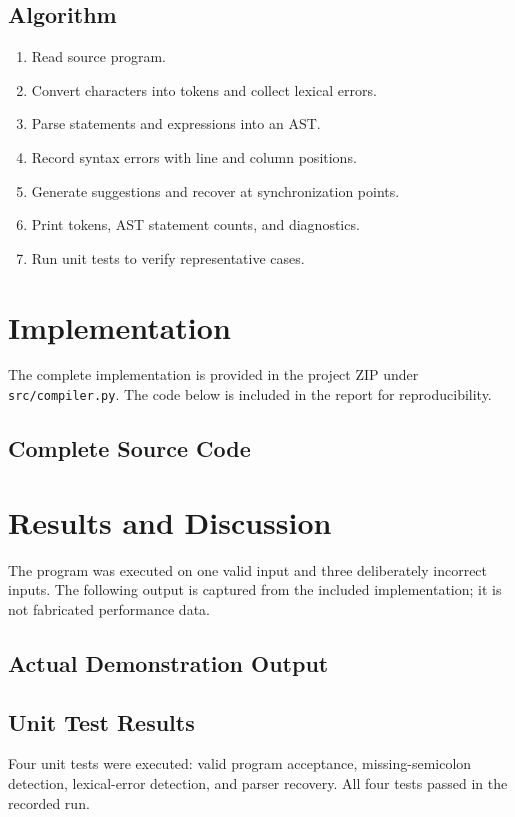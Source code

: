 \documentclass[12pt,a4paper]{article}
\begin{document}
\subsection{Algorithm}
\begin{enumerate}
\item Read source program.
\item Convert characters into tokens and collect lexical errors.
\item Parse statements and expressions into an AST.
\item Record syntax errors with line and column positions.
\item Generate suggestions and recover at synchronization points.
\item Print tokens, AST statement counts, and diagnostics.
\item Run unit tests to verify representative cases.
\end{enumerate}

\section{Implementation}
The complete implementation is provided in the project ZIP under \texttt{src/compiler.py}. The code below is included in the report for reproducibility.

\subsection{Complete Source Code}


\section{Results and Discussion}
The program was executed on one valid input and three deliberately incorrect inputs. The following output is captured from the included implementation; it is not fabricated performance data.

\subsection{Actual Demonstration Output}


\subsection{Unit Test Results}
Four unit tests were executed: valid program acceptance, missing-semicolon detection, lexical-error detection, and parser recovery. All four tests passed in the recorded run.
\end{document}
